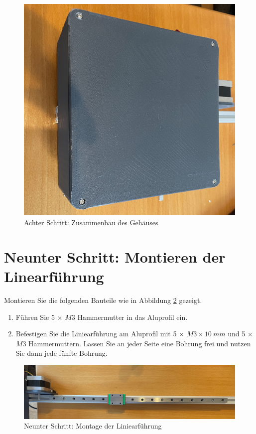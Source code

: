 \begin{figure}[H]
	\begin{center}
		\includegraphics[width=\textwidth]{Images/8Schr.jpg}
		\caption{Achter Schritt: Zusammenbau des Gehäuses} \label{8.S}
	\end{center}
\end{figure}

\section{Neunter Schritt: Montieren der Linearführung}

Montieren Sie die folgenden Bauteile wie in Abbildung \ref{9.S} gezeigt.

\begin{enumerate}
	\item Führen Sie 5 $\times$ $ M3 $ Hammermutter in das Aluprofil ein.
	\item Befestigen Sie die Liniearführung am Aluprofil mit 5 $\times$ $ M3 \times 10 \ mm $ und 5 $\times$ $ M3 $ Hammermuttern. Lassen Sie an jeder Seite eine Bohrung frei und nutzen Sie dann jede fünfte Bohrung. 
\end{enumerate}

\begin{figure}[H]
	\begin{center}
		\includegraphics[width=\textwidth]{Images/9Schr.jpg}
		\caption{Neunter Schritt: Montage der Liniearführung} \label{9.S}
	\end{center}
\end{figure}

